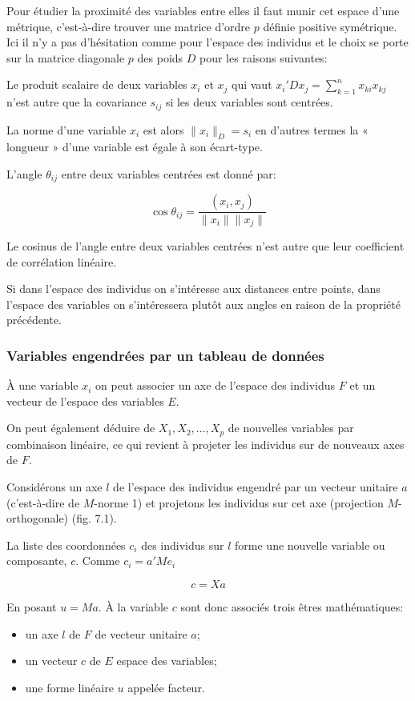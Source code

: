\documentclass[12pt,a4paper]{article}
\begin{document}
Pour étudier la proximité des variables entre elles il faut munir cet espace d'une métrique,
c'est-à-dire trouver une matrice d'ordre $p$ définie positive symétrique. Ici il n'y a pas
d'hésitation comme pour l'espace des individus et le choix se porte sur la matrice diagonale
$p$ des poids $D$ pour les raisons suivantes:

Le produit scalaire de deux variables $x_i$ et $x_j$ qui vaut $x_i'Dx_j = \sum_{k=1}^n x_{ki}x_{kj}$ n'est autre
que la covariance $s_{ij}$ si les deux variables sont centrées.

La norme d'une variable $x_i$ est alors $\lVert x_i \rVert_D = s_i$ en d'autres termes la « longueur » d'une variable est égale à son écart-type.

L'angle $\theta_{ij}$ entre deux variables centrées est donné par:

\[\cos\theta_{ij} = \frac{(x_i, x_j)}{\lVert x_i \rVert \lVert x_j \rVert}\]

Le cosinus de l'angle entre deux variables centrées n'est autre que leur coefficient de
corrélation linéaire.

Si dans l'espace des individus on s'intéresse aux distances entre points, dans l'espace des
variables on s'intéressera plutôt aux angles en raison de la propriété précédente.

\subsubsection{Variables engendrées par un tableau de données}

À une variable $x_i$ on peut associer un axe de l'espace des individus $F$ et un vecteur de
l'espace des variables $E$.

On peut également déduire de $X_1, X_2, \dots, X_p$ de nouvelles variables par combinaison
linéaire, ce qui revient à projeter les individus sur de nouveaux axes de $F$.

Considérons un axe $l$ de l'espace des individus engendré par un vecteur unitaire $a$
(c'est-à-dire de $M$-norme 1) et projetons les individus sur cet axe (projection $M$-orthogonale)
(fig. 7.1).

La liste des coordonnées $c_i$ des individus sur $l$ forme une nouvelle variable ou composante, $c$.
Comme $c_i = a'Me_i$

\[c = Xa\]

En posant $u = M a$.
À la variable $c$ sont donc associés trois êtres mathématiques:
\begin{itemize}
\item un axe $l$ de $F$ de vecteur unitaire $a$;
\item un vecteur $c$ de $E$ espace des variables;
\item une forme linéaire $u$ appelée facteur.
\end{itemize}
\end{document}
